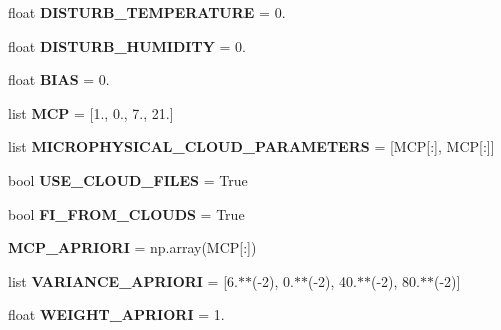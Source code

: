 \begin{DoxyCompactItemize}
float {\bfseries D\+I\+S\+T\+U\+R\+B\+\_\+\+T\+E\+M\+P\+E\+R\+A\+T\+U\+RE} = 0.
\item 
\mbox{\label{namespaceinp_a5592931fbe830f506920f1bbad019a31}} 
float {\bfseries D\+I\+S\+T\+U\+R\+B\+\_\+\+H\+U\+M\+I\+D\+I\+TY} = 0.
\item 
\mbox{\label{namespaceinp_aa0f2f2d4d16e7bf0089ef46952b2f1cd}} 
float {\bfseries B\+I\+AS} = 0.
\item 
\mbox{\label{namespaceinp_adac47096110ef6eead4c66089c085572}} 
list {\bfseries M\+CP} = \mbox{[}1., 0., 7., 21.\mbox{]}
\item 
\mbox{\label{namespaceinp_a5fac027c46816fffc6593f7503dacdf0}} 
list {\bfseries M\+I\+C\+R\+O\+P\+H\+Y\+S\+I\+C\+A\+L\+\_\+\+C\+L\+O\+U\+D\+\_\+\+P\+A\+R\+A\+M\+E\+T\+E\+RS} = \mbox{[}M\+CP\mbox{[}\+:\mbox{]}, M\+CP\mbox{[}\+:\mbox{]}\mbox{]}
\item 
\mbox{\label{namespaceinp_a3a7da15ce861159bfac5eb6ef7147ccc}} 
bool {\bfseries U\+S\+E\+\_\+\+C\+L\+O\+U\+D\+\_\+\+F\+I\+L\+ES} = True
\item 
\mbox{\label{namespaceinp_abdeff4b088b096bf52cdcd16772de9fd}} 
bool {\bfseries F\+I\+\_\+\+F\+R\+O\+M\+\_\+\+C\+L\+O\+U\+DS} = True
\item 
\mbox{\label{namespaceinp_a5c2b40f330b8e8c8038d293d677e068d}} 
{\bfseries M\+C\+P\+\_\+\+A\+P\+R\+I\+O\+RI} = np.\+array(M\+CP\mbox{[}\+:\mbox{]})
\item 
\mbox{\label{namespaceinp_ac279330fd4a4735694176e0254732219}} 
list {\bfseries V\+A\+R\+I\+A\+N\+C\+E\+\_\+\+A\+P\+R\+I\+O\+RI} = \mbox{[}6.$\ast$$\ast$(-\/2), 0.$\ast$$\ast$(-\/2), 40.$\ast$$\ast$(-\/2), 80.$\ast$$\ast$(-\/2)\mbox{]}
\item 
\mbox{\label{namespaceinp_a352d9a3f413ff9fe639ab57acf0819cd}} 
float {\bfseries W\+E\+I\+G\+H\+T\+\_\+\+A\+P\+R\+I\+O\+RI} = 1.
\item 
\mbox{\label{namespaceinp_af2f3560a7c0fa8dbfbe4ee2ada597260}} 

\end{DoxyCompactItemize}
